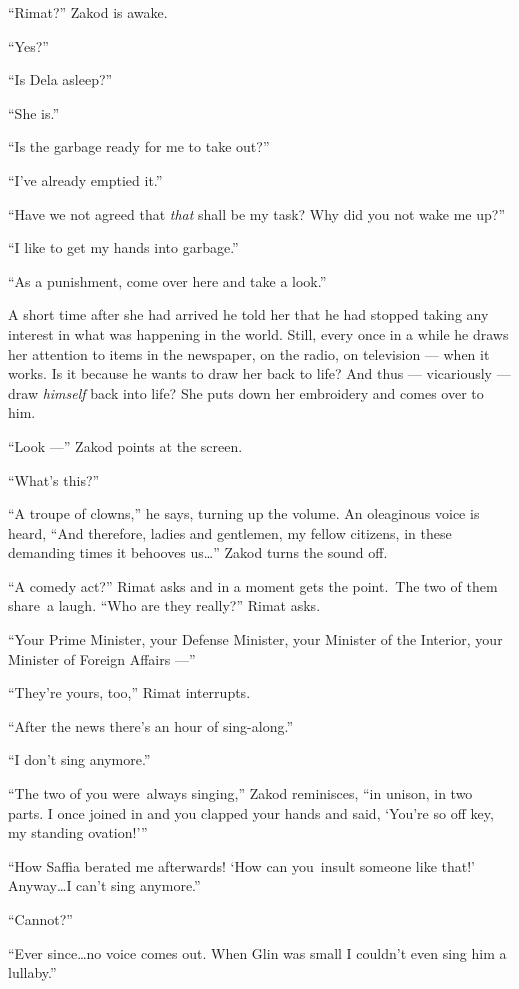 \documentclass[twoside,11pt]{book}
\begin{document}
``Rimat?'' Zakod is awake.

``Yes?''

``Is Dela asleep?''

``She is.''

``Is the garbage ready for me to take out?''

``I've already emptied it.''

``Have we not agreed that \textit{that} shall be my task? Why did you not wake me up?''

``I like to get my hands into garbage.''

``As a punishment, come over here and take a look.''

A short time after she had arrived he told her that he had stopped taking any interest in what was happening in the
world. Still, every once in a while he draws her attention to items in the newspaper, on the radio, on television ---
when it works. Is it because he wants to draw her back to life? And thus --- vicariously --- draw \textit{himself} back
into life? She puts down her embroidery and comes over to him.

``Look ---'' Zakod points at the screen.

``What's this?''

``A troupe of clowns,'' he says, turning up the volume. An oleaginous voice is heard,
``And therefore, ladies and gentlemen, my fellow citizens, in these demanding times it behooves
us{\ldots}'' Zakod turns the sound off.

``A comedy act?'' Rimat asks and in a moment gets the point.~The two of them share~a laugh.
``Who are they really?'' Rimat asks.

``Your Prime Minister, your Defense Minister, your Minister of the Interior, your Minister of Foreign
Affairs ---''

``They're yours, too,'' Rimat interrupts.

``After the news there's an hour of sing-along.''

``I don't sing anymore.''

``The two of you were~always singing,'' Zakod reminisces, ``in unison, in two
parts. I once joined in and you clapped your hands and said, `You're so off key, my standing ovation!'\thinspace''

``How Saffia berated me afterwards!  `How can you~insult someone like that!' Anyway{\ldots}I can't sing
anymore.''

``Cannot?''

``Ever since{\ldots}no voice comes out. When Glin was small I couldn't even sing him a
lullaby.''
\end{document}

